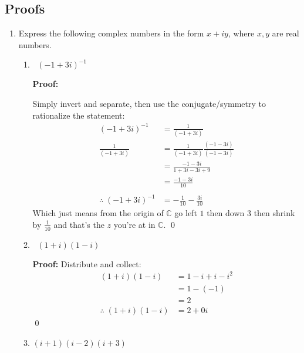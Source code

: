 \subsection{Proofs}
\begin{enumerate}
	\item Express the following complex numbers in the form $x + iy$, where $x, y$ are real numbers.
	      \begin{enumerate}
		      \item $\;\;(-1 + 3i)^{-1}$

		            \textbf{Proof:}

		            Simply invert and separate, then use the conjugate/symmetry to rationalize the statement:
		            \begin{align*}
			            (-1 + 3i)^{-1} & = \frac{1}{(-1 + 3i)}                            \\
			            \frac{1}{(-1 + 3i)}
			                           & = \frac{1}{(-1 + 3i)}\frac{(-1 - 3i)}{(-1 - 3i)} \\
			                           & = \frac{-1 - 3i}{1 + 3i - 3i + 9}                \\
			                           & = \frac{-1 - 3i}{10}                             \\
			            \\
			            \therefore \; (-1 + 3i)^{-1}
			                           & = -\frac{1}{10} - \frac{3i}{10}
		            \end{align*}
		            Which just means from the origin of $\mathbb{C}$ go left $1$ then down $3$ then shrink
		            by $\frac{1}{10}$ and that's the $z$ you're at in $\mathbb{C}.$
		            \qed

		      \item $\;\;(1 + i)(1 - i)$

		            \textbf{Proof:}
		            Distribute and collect:
		            \begin{align*}
			            (1 + i)(1 - i) & = 1 -i + i - i^2 \\
			                           & = 1 - (-1)       \\
			                           & = 2              \\
			            \therefore \; (1 + i)(1 - i)
			                           & = 2 + 0i
		            \end{align*}
		            \qed

		      \item $(i + 1)(i - 2)(i + 3)$


\end{enumerate}
\end{enumerate}
